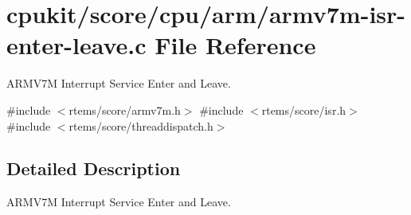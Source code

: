 \hypertarget{armv7m-isr-enter-leave_8c}{}\section{cpukit/score/cpu/arm/armv7m-\/isr-\/enter-\/leave.c File Reference}
\label{armv7m-isr-enter-leave_8c}


A\+R\+M\+V7M Interrupt Service Enter and Leave.  


{\ttfamily \#include $<$rtems/score/armv7m.\+h$>$}\newline
{\ttfamily \#include $<$rtems/score/isr.\+h$>$}\newline
{\ttfamily \#include $<$rtems/score/threaddispatch.\+h$>$}\newline


\subsection{Detailed Description}
A\+R\+M\+V7M Interrupt Service Enter and Leave. 

